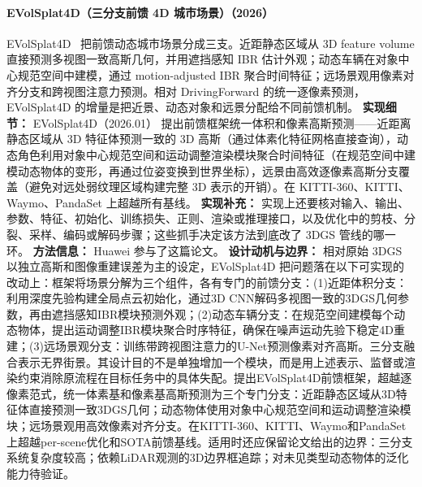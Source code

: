 \paragraph{EVolSplat4D（三分支前馈 4D 城市场景）（2026）}
EVolSplat4D~\cite{2601_15951} 把前馈动态城市场景分成三支。近距静态区域从 3D feature volume 直接预测多视图一致高斯几何，并用遮挡感知 IBR 估计外观；动态车辆在对象中心规范空间中建模，通过 motion-adjusted IBR 聚合时间特征；远场景观用像素对齐分支和跨视图注意力预测。相对 DrivingForward 的统一逐像素预测，EVolSplat4D 的增量是把近景、动态对象和远景分配给不同前馈机制。
\textbf{实现细节：} EVolSplat4D（2026.01） 提出前馈框架统一体积和像素高斯预测——近距离静态区域从 3D 特征体预测一致的 3D 高斯（通过体素化特征网格直接查询），动态角色利用对象中心规范空间和运动调整渲染模块聚合时间特征（在规范空间中建模动态物体的变形，再通过位姿变换到世界坐标），远景由高效逐像素高斯分支覆盖（避免对远处弱纹理区域构建完整 3D 表示的开销）。在 KITTI-360、KITTI、Waymo、PandaSet 上超越所有基线。
\textbf{实现补充：} 实现上还要核对输入、输出、参数、特征、初始化、训练损失、正则、渲染或推理接口，以及优化中的剪枝、分裂、采样、编码或解码步骤；这些抓手决定该方法到底改了 3DGS 管线的哪一环。
\textbf{方法信息：} Huawei 参与了这篇论文。
\textbf{设计动机与边界：} 相对原始 3DGS 以独立高斯和图像重建误差为主的设定，EVolSplat4D 把问题落在以下可实现的改动上：框架将场景分解为三个组件，各有专门的前馈分支：(1)近距体积分支：利用深度先验构建全局点云初始化，通过3D CNN解码多视图一致的3DGS几何参数，再由遮挡感知IBR模块预测外观；(2)动态车辆分支：在规范空间建模每个动态物体，提出运动调整IBR模块聚合时序特征，确保在噪声运动先验下稳定4D重建；(3)远场景观分支：训练带跨视图注意力的U-Net预测像素对齐高斯。三分支融合表示无界街景。其设计目的不是单独增加一个模块，而是用上述表示、监督或渲染约束消除原流程在目标任务中的具体失配。提出EVolSplat4D前馈框架，超越逐像素范式，统一体素基和像素基高斯预测为三个专门分支：近距静态区域从3D特征体直接预测一致3DGS几何；动态物体使用对象中心规范空间和运动调整渲染模块；远场景观用高效像素对齐分支。在KITTI-360、KITTI、Waymo和PandaSet上超越per-scene优化和SOTA前馈基线。适用时还应保留论文给出的边界：三分支系统复杂度较高；依赖LiDAR观测的3D边界框追踪；对未见类型动态物体的泛化能力待验证。
